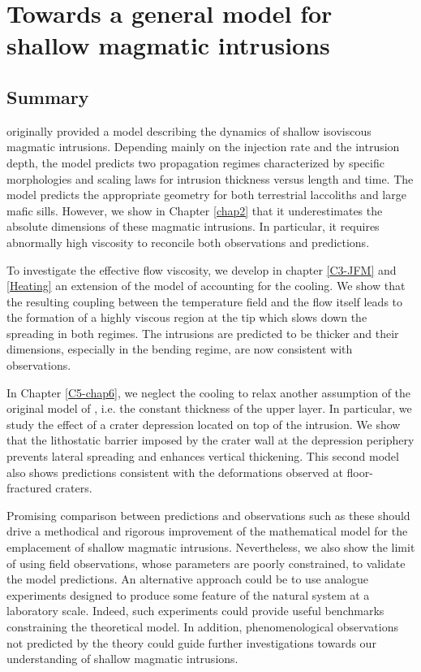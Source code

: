 \chapter{Towards a general model for shallow magmatic intrusions}
\label{chap7}
\minitoc

\section{Summary}
\label{sec:summary-2}

\citet{Michaut:2011kg}  originally  provided  a model  describing  the
dynamics of shallow isoviscous  magmatic intrusions.  Depending mainly
on the injection rate and the  intrusion depth, the model predicts two
propagation regimes characterized by specific morphologies and scaling
laws  for  intrusion thickness  versus  length  and time.   The  model
predicts the appropriate geometry  for both terrestrial laccoliths and
large mafic  sills. However,  we show in  Chapter \ref{chap2}  that it
underestimates   the    absolute   dimensions   of    these   magmatic
intrusions. In  particular, it  requires abnormally high  viscosity to
reconcile both observations and predictions.

To investigate  the effective  flow viscosity,  we develop  in chapter
\ref{C3-JFM}  and   \ref{Heating}  an   extension  of  the   model  of
\citet{Michaut:2011kg} accounting  for the cooling.  We  show that the
resulting coupling between  the temperature field and  the flow itself
leads to  the formation of  a highly viscous  region at the  tip which
slows  down  the  spreading  in  both  regimes.   The  intrusions  are
predicted  to  be thicker  and  their  dimensions, especially  in  the
bending regime, are now consistent with observations.

In Chapter  \ref{C5-chap6}, we  neglect the  cooling to  relax another
assumption of  the original model of  \citet{Michaut:2011kg}, i.e. the
constant thickness  of the  upper layer. In  particular, we  study the
effect of a crater depression located on top of the intrusion. We show
that  the  lithostatic barrier  imposed  by  the  crater wall  at  the
depression periphery prevents lateral  spreading and enhances vertical
thickening. This second model also shows predictions consistent with
the deformations observed at floor-fractured craters.

Promising  comparison between  predictions  and  observations such  as
these  should  drive a  methodical  and  rigorous improvement  of  the
mathematical model for the emplacement of shallow magmatic intrusions.
Nevertheless,  we also  show the  limit of  using field  observations,
whose  parameters  are  poorly  constrained,  to  validate  the  model
predictions.   An  alternative  approach  could  be  to  use  analogue
experiments designed to produce some  feature of the natural system at
a  laboratory scale.   Indeed, such  experiments could  provide useful
benchmarks   constraining  the   theoretical   model.   In   addition,
phenomenological observations not predicted  by the theory could guide
further investigations  towards our understanding of  shallow magmatic
intrusions.

